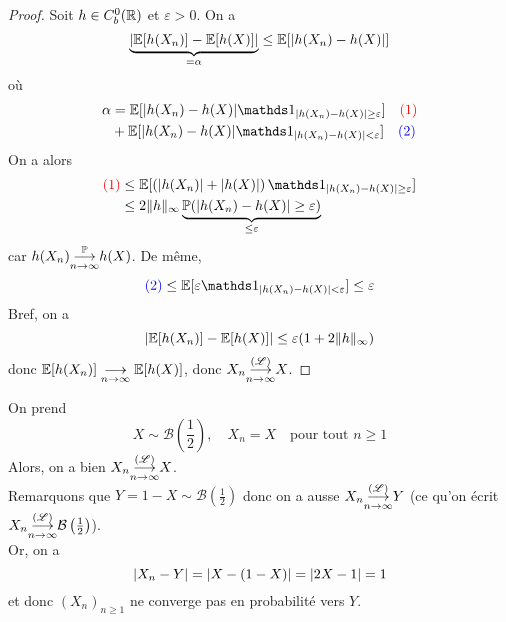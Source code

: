 \begin{proof}
    Soit \(h\in C_b^0(\mathbb{R})\) et \(\varepsilon>0\). On a
    \begin{equation*}
        \underbrace{\mathopen{}\left|\mathbb{E}[h(X_n)] - \mathbb{E}[h(X)]\right|\mathclose{}}_{=\alpha} \leq \mathbb{E}[\mathopen{}\left|h(X_n)-h(X)\right|\mathclose{}]
    \end{equation*}
    où
    \begin{equation*}
        \begin{aligned}
            \alpha 
            &= \bb E[\n{h(X_n)-h(X)}\one_{\n{h(X_n)-h(X)}\geq \varepsilon}]\quad \color{red}(1)\\
            \color{black}&+ \bb E[\n{h(X_n)-h(X)}\one_{\n{h(X_n)-h(X)}< \varepsilon}]\quad \color{blue}(2)
        \end{aligned}
    \end{equation*}
    On a alors
    \begin{equation*}
        \begin{aligned}
            \color{red}(1) \color{black}
            &\leq \bb E[\left(\n{h(X_n)}+\n{h(X)}\right)\one_{\n{h(X_n)-h(X)}\geq \varepsilon}]\\
            &\leq 2 \nn{h}_{\infty} \underbrace{\bb P(\n{h(X_n)-h(X)}\geq \varepsilon)}_{\leq\varepsilon}\\
        \end{aligned}
    \end{equation*}
    car \(h(X_n)\underset{n\to\infty}{{\overset{\mathbb{P}}{\longrightarrow}}} h(X)\).
    De même,
    \begin{equation*}
        \color{blue}(2) \color{black}
        \leq \bb E[\varepsilon \one_{\n{h(X_n)-h(X)}< \varepsilon}]\leq \varepsilon
    \end{equation*}
    Bref, on a
    \begin{equation*}
        \mathopen{}\left|\mathbb{E}[h(X_n)] - \mathbb{E}[h(X)]\right|\mathclose{} \leq \varepsilon(1 + 2\mathopen{}\left\|h\right\|\mathclose{}_{\infty})
    \end{equation*}
    donc \(\mathbb{E}[h(X_n)] \underset{n\to\infty}{\longrightarrow} \mathbb{E}[h(X)]\), donc \(X_n\underset{n\to\infty}{{\overset{(\mathscr{L})}{\longrightarrow}}} X\).
\end{proof}

\begin{example}
    On prend
    \begin{equation*}
        X\sim \mathcal B\left(\frac12\right),\quad X_n = X \quad\text{pour tout } n\geq 1
    \end{equation*}
    Alors, on a bien \(X_n\underset{n\to\infty}{{\overset{(\mathscr{L})}{\longrightarrow}}} X\).\\
    Remarquons que \(Y = 1-X\sim \mathcal B\left(\frac12\right)\) donc on a ausse
    \(X_n\underset{n\to\infty}{{\overset{(\mathscr{L})}{\longrightarrow}}} Y\) (ce qu'on écrit \(X_n\underset{n\to\infty}{{\overset{(\mathscr{L})}{\longrightarrow}}} \mathcal B\left(\frac12\right)\)).\\
    Or, on a
    \begin{equation*}
        \mathopen{}\left|X_n - Y\right|\mathclose{} = \mathopen{}\left|X-(1-X)\right|\mathclose{} = \mathopen{}\left|2X-1\right|\mathclose{} = 1
    \end{equation*}
    et donc \({(X_n)}_{n\geq 1}\) ne converge pas en probabilité vers \(Y\).
\end{example}

